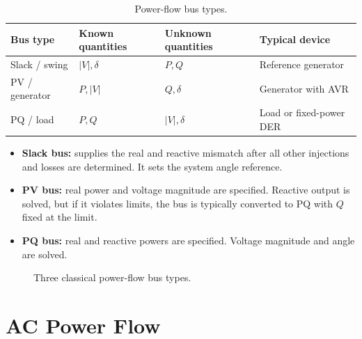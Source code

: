 \documentclass[11pt]{article}
\begin{document}
\begin{table}[h]
\centering
\begin{tabular}{llll}
\toprule
Bus type & Known quantities & Unknown quantities & Typical device \\
\midrule
Slack / swing & $|V|,\delta$ & $P,Q$ & Reference generator \\
PV / generator & $P,|V|$ & $Q,\delta$ & Generator with AVR \\
PQ / load & $P,Q$ & $|V|,\delta$ & Load or fixed-power DER \\
\bottomrule
\end{tabular}
\caption{Power-flow bus types.}
\end{table}

\begin{itemize}
  \item \textbf{Slack bus:} supplies the real and reactive mismatch after all
  other injections and losses are determined. It sets the system angle reference.
  \item \textbf{PV bus:} real power and voltage magnitude are specified. Reactive
  output is solved, but if it violates limits, the bus is typically converted to
  PQ with $Q$ fixed at the limit.
  \item \textbf{PQ bus:} real and reactive powers are specified. Voltage magnitude
  and angle are solved.
\end{itemize}

\begin{figure}[h]
\centering
{}
\caption{Three classical power-flow bus types.}
\end{figure}

\section{AC Power Flow}
\end{document}

